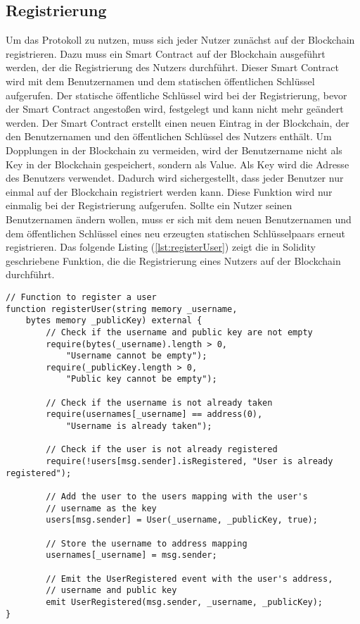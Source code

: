 \subsection{Registrierung}
\label{subsec:contract_registrierung}
Um das Protokoll zu nutzen, muss sich jeder Nutzer zunächst auf der Blockchain registrieren. Dazu muss ein Smart Contract auf der Blockchain ausgeführt werden, der die Registrierung des Nutzers durchführt. Dieser Smart Contract wird mit dem Benutzernamen und dem statischen öffentlichen Schlüssel aufgerufen. Der statische öffentliche Schlüssel wird bei der Registrierung, bevor der Smart Contract angestoßen wird, festgelegt und kann nicht mehr geändert werden. Der Smart Contract erstellt einen neuen Eintrag in der Blockchain, der den Benutzernamen und den öffentlichen Schlüssel des Nutzers enthält. Um Dopplungen in der Blockchain zu vermeiden, wird der Benutzername nicht als Key in der Blockchain gespeichert, sondern als Value. Als Key wird die Adresse des Benutzers verwendet. Dadurch wird sichergestellt, dass jeder Benutzer nur einmal auf der Blockchain registriert werden kann. Diese Funktion wird nur einmalig bei der Registrierung aufgerufen. Sollte ein Nutzer seinen Benutzernamen ändern wollen, muss er sich mit dem neuen Benutzernamen und dem öffentlichen Schlüssel eines neu erzeugten statischen Schlüsselpaars erneut registrieren. Das folgende Listing (\ref{lst:registerUser}) zeigt die in Solidity geschriebene Funktion, die die Registrierung eines Nutzers auf der Blockchain durchführt.

\begin{lstlisting}[language=Solidity, caption={Registrierung eines Nutzers auf der Blockchain},captionpos=b, label
    =lst:registerUser]
// Function to register a user
function registerUser(string memory _username, 
    bytes memory _publicKey) external {
        // Check if the username and public key are not empty
        require(bytes(_username).length > 0, 
            "Username cannot be empty");
        require(_publicKey.length > 0, 
            "Public key cannot be empty");

        // Check if the username is not already taken
        require(usernames[_username] == address(0), 
            "Username is already taken");

        // Check if the user is not already registered
        require(!users[msg.sender].isRegistered, "User is already registered");

        // Add the user to the users mapping with the user's 
        // username as the key
        users[msg.sender] = User(_username, _publicKey, true);

        // Store the username to address mapping
        usernames[_username] = msg.sender;

        // Emit the UserRegistered event with the user's address, 
        // username and public key
        emit UserRegistered(msg.sender, _username, _publicKey);
}
\end{lstlisting}


